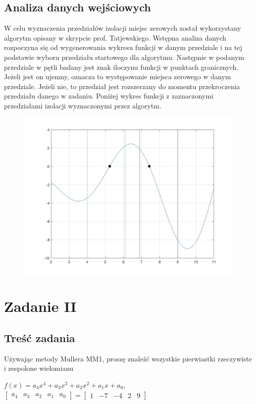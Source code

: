\documentclass[11pt, oneside]{article}   	%
\begin{document}
\subsection{Analiza danych wejściowych}
W celu wyznaczenia przedziałów izolacji miejsc zerowych został wykorzystany algorytm opisany w skrypcie prof. Tatjewskiego. Wstępna analiza danych rozpoczyna się od wygenerowania wykresu funkcji w danym przedziale i na tej podstawie wyboru przedziału startowego dla algorytmu. Następnie w podanym przedziale w pętli badany jest znak iloczynu funkcji w punktach granicznych. Jeżeli jest on ujemny, oznacza to występowanie miejsca zerowego w danym przedziale. Jeżeli nie, to przedział jest rozszerzany do momentu przekroczenia przedziału danego w zadaniu. 
Poniżej wykres funkcji z zaznaczonymi przedziałami izolacji wyznaczonymi przez algorytm. 

\begin{figure}[h]
\includegraphics[width=\textwidth]{figure1.jpg}
\end{figure}

\section{Zadanie II}
\subsection{Treść zadania}
Używając metody Mullera MM1, proszę znaleźć wszystkie pierwiastki rzeczywiste i zespolone wielomianu
\begin{center}
$f(x) = a_{4}x^4+a_{3}x^3+a_{2}x^2+a_{1}x+a_{0}$,  
$
\left[
\begin{array}{ccccc}
       a_{4} & a_{3} & a_{2} & a_{1} & a_{0}
\end{array}
\right]
=
\left[
\begin{array}{ccccc}
       1 & -7 & -4 & 2 & 9
\end{array}
\right]$
\end{center}
\end{document}
